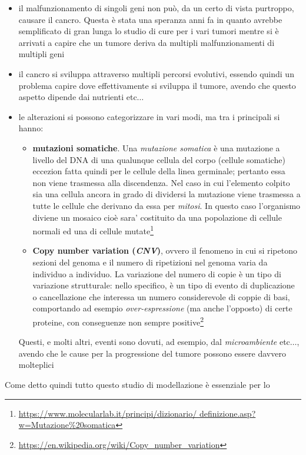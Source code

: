 \documentclass[a4paper,12pt, oneside]{book}
\begin{document}
\begin{itemize}
  \item il malfunzionamento di singoli geni non può, da un certo di vista
  purtroppo, causare il cancro. Questa è stata una speranza anni fa in quanto
  avrebbe semplificato di gran lunga lo studio di cure per i vari tumori mentre
  si è arrivati a capire che un tumore deriva da multipli malfunzionamenti di
  multipli geni
  \item il cancro si sviluppa attraverso multipli percorsi evolutivi, essendo
  quindi un problema capire dove effettivamente si sviluppa il tumore, avendo
  che questo aspetto dipende dai nutrienti etc$\ldots$
  \item le alterazioni si possono categorizzare in vari modi, ma tra i
  principali si hanno:
  \begin{itemize}
    \item \textbf{mutazioni somatiche}. Una \textit{mutazione somatica} è una
    mutazione a livello del DNA di una qualunque cellula del corpo (cellule
    somatiche) eccezion fatta quindi per le cellule della linea germinale;
    pertanto essa non viene trasmessa alla discendenza. Nel caso in cui
    l'elemento colpito sia una cellula ancora in grado di dividersi la mutazione
    viene trasmessa a tutte le cellule che derivano da essa per
    \textit{mitosi}. In questo caso l'organismo diviene un mosaico cioè sara'
    costituito da una popolazione di cellule normali ed una di cellule
    mutate\footnote{\url{https://www.molecularlab.it/principi/dizionario/
        definizione.asp?w=Mutazione\%20somatica}}
    \item \textbf{Copy number variation (\textit{CNV})}, ovvero il fenomeno in
    cui si ripetono sezioni del genoma e il numero di ripetizioni nel genoma
    varia da individuo a individuo. La variazione del numero di copie è un tipo
    di variazione strutturale: nello specifico, è un tipo di evento di
    duplicazione o cancellazione che interessa un numero considerevole di coppie
    di basi, comportando ad esempio \textit{over-espressione} (ma anche
    l'opposto) di certe proteine, con conseguenze non sempre
    positive\footnote{\url{https://en.wikipedia.org/wiki/Copy_number_variation}}
  \end{itemize}
  Questi, e molti altri, eventi sono dovuti, ad esempio, dal
  \textit{microambiente} etc$\ldots$, avendo che le cause per la progressione
  del tumore possono essere davvero molteplici
\end{itemize}
Come detto quindi tutto questo studio di modellazione è essenziale per lo
\end{document}
